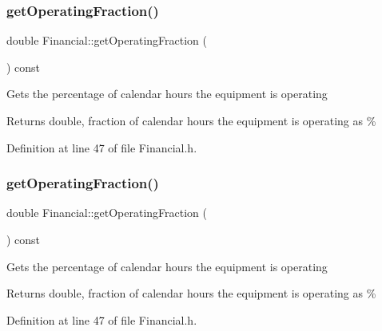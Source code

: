 \subsubsection{\texorpdfstring{get\+Operating\+Fraction()}{getOperatingFraction()}\hspace{0.1cm}{\footnotesize\ttfamily [1/3]}}
{\footnotesize\ttfamily double Financial\+::get\+Operating\+Fraction (\begin{DoxyParamCaption}{ }\end{DoxyParamCaption}) const\hspace{0.3cm}{\ttfamily [inline]}}

Gets the percentage of calendar hours the equipment is operating

\begin{DoxyReturn}{Returns}
double, fraction of calendar hours the equipment is operating as \% 
\end{DoxyReturn}


Definition at line 47 of file Financial.\+h.

\mbox{\label{class_financial_a650ee2678b49d8d19b541f15d5a37c05}} 
\subsubsection{\texorpdfstring{get\+Operating\+Fraction()}{getOperatingFraction()}\hspace{0.1cm}{\footnotesize\ttfamily [2/3]}}
{\footnotesize\ttfamily double Financial\+::get\+Operating\+Fraction (\begin{DoxyParamCaption}{ }\end{DoxyParamCaption}) const\hspace{0.3cm}{\ttfamily [inline]}}

Gets the percentage of calendar hours the equipment is operating

\begin{DoxyReturn}{Returns}
double, fraction of calendar hours the equipment is operating as \% 
\end{DoxyReturn}


Definition at line 47 of file Financial.\+h.

\mbox{\label{class_financial_a650ee2678b49d8d19b541f15d5a37c05}} 
